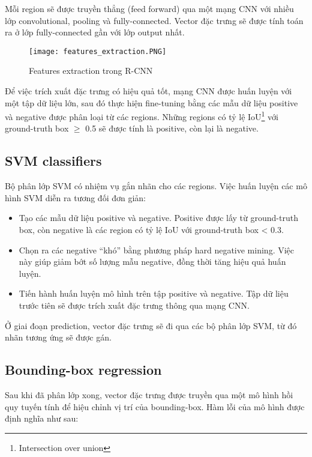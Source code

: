 \documentclass[../thesis.tex]{subfiles}
\begin{document}
Mỗi region sẽ được truyền thẳng (feed forward) qua một mạng CNN với nhiều lớp convolutional, pooling và fully-connected. Vector đặc trưng sẽ được tính toán ra ở lớp fully-connected gần với lớp output nhất.

\begin{figure}[H]
	\centering
	\texttt{[image: features\_extraction.PNG]}
	\caption{Features extraction trong R-CNN}\label{Fig:rcnn_features_extraction}
\end{figure}

Để việc trích xuất đặc trưng có hiệu quả tốt, mạng CNN được huấn luyện với một tập dữ liệu lớn, sau đó thực hiện fine-tuning bằng các mẫu dữ liệu positive và negative được phân loại từ các regions. Những regions có tỷ lệ IoU\footnote{Intersection over union} với ground-truth box $\geq$ 0.5 sẽ được tính là positive, còn lại là negative.

\subsection{SVM classifiers}

Bộ phân lớp SVM có nhiệm vụ gắn nhãn cho các regions. Việc huấn luyện các mô hình SVM diễn ra tương đối đơn giản:

\begin{itemize}
	\item Tạo các mẫu dữ liệu positive và negative. Positive được lấy từ ground-truth box, còn negative là các region có tỷ lệ IoU với ground-truth box < 0.3.
	\item Chọn ra các negative “khó” bằng phương pháp hard negative mining. Việc này giúp giảm bớt số lượng mẫu negative, đồng thời tăng hiệu quả huấn luyện.
	\item Tiến hành huấn luyện mô hình trên tập positive và negative. Tập dữ liệu trước tiên sẽ được trích xuất đặc trưng thông qua mạng CNN.
\end{itemize}

Ở giai đoạn prediction, vector đặc trưng sẽ đi qua các bộ phân lớp SVM, từ đó nhãn tương ứng sẽ được gán.

\subsection{Bounding-box regression}

Sau khi đã phân lớp xong, vector đặc trưng được truyền qua một mô hình hồi quy tuyến tính để hiệu chỉnh vị trí của bounding-box. Hàm lỗi của mô hình được định nghĩa như sau:
\end{document}

